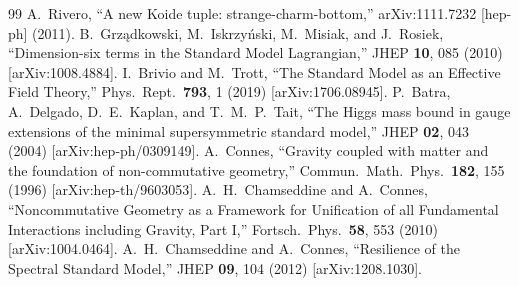 \documentclass[twocolumn,aps,prd,floatfix,nofootinbib,superscriptaddress,10pt]{article}
\begin{document}
\begin{thebibliography}{99}
 A.~Rivero, ``A new Koide tuple: strange-charm-bottom,'' arXiv:1111.7232 [hep-ph] (2011).
 B.~Grz\k{a}dkowski, M.~Iskrzy\'nski, M.~Misiak, and J.~Rosiek, ``Dimension-six terms in the Standard Model Lagrangian,'' JHEP \textbf{10}, 085 (2010) [arXiv:1008.4884].
 I.~Brivio and M.~Trott, ``The Standard Model as an Effective Field Theory,'' Phys.\ Rept.\ \textbf{793}, 1 (2019) [arXiv:1706.08945].
 P.~Batra, A.~Delgado, D.~E.~Kaplan, and T.~M.~P.~Tait, ``The Higgs mass bound in gauge extensions of the minimal supersymmetric standard model,'' JHEP \textbf{02}, 043 (2004) [arXiv:hep-ph/0309149].
 A.~Connes, ``Gravity coupled with matter and the foundation of non-commutative geometry,'' Commun.\ Math.\ Phys.\ \textbf{182}, 155 (1996) [arXiv:hep-th/9603053].
 A.~H.~Chamseddine and A.~Connes, ``Noncommutative Geometry as a Framework for Unification of all Fundamental Interactions including Gravity, Part I,'' Fortsch.\ Phys.\ \textbf{58}, 553 (2010) [arXiv:1004.0464].
 A.~H.~Chamseddine and A.~Connes, ``Resilience of the Spectral Standard Model,'' JHEP \textbf{09}, 104 (2012) [arXiv:1208.1030].
\end{thebibliography}
\end{document}
